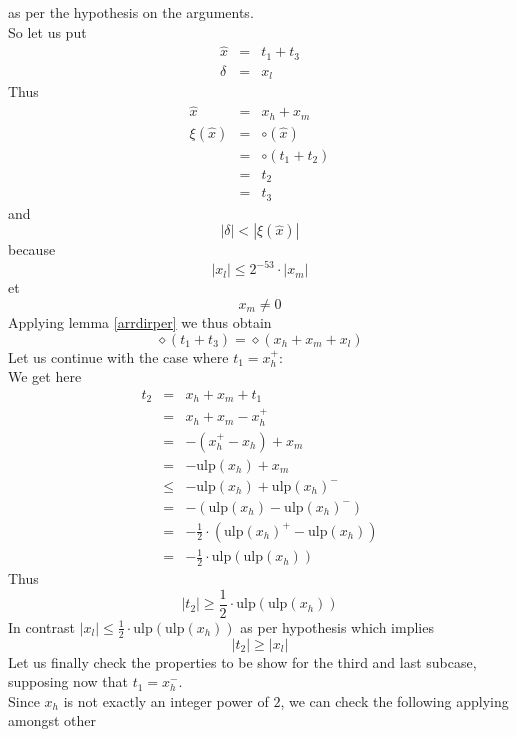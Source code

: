 \documentclass[a4paper,10pt,twoside]{article}
\newenvironment{proof}[1][Proof]{\begin{trivlist}
\item[\hskip \labelsep {\bfseries #1}]}{\end{trivlist}}
\newcommand{\hi}{\ensuremath{\mathit{h}}}
\newcommand{\mi}{\ensuremath{\mathit{m}}}
\newcommand{\lo}{\ensuremath{\mathit{l}}}
\newcommand{\mUlp}{\ensuremath{\mathrm{ulp}}}
\begin{document}
\begin{proof}
as per the hypothesis on the arguments.  \\
So let us put
\begin{eqnarray*}
\hat{x} & = & t_1 + t_3 \\
\delta & = & x_\lo 
\end{eqnarray*}
Thus
\begin{eqnarray*}
\hat{x} & = & x_\hi + x_\mi \\
\xi\left( \hat{x} \right) & = & \circ \left( \hat{x} \right) \\
& = & \circ \left( t_1 + t_2 \right) \\
& = & t_2 \\
& = & t_3
\end{eqnarray*}
and
$$\left \vert \delta \right \vert < \left \vert \xi\left( \hat{x} \right) \right \vert$$
because
$$\left \vert x_\lo \right \vert \leq 2^{-53} \cdot \left \vert x_\mi \right \vert$$
et $$x_\mi \not = 0$$
Applying lemma \ref{arrdirper} we thus obtain 
$$\diamond \left( t_1 + t_3 \right) = \diamond \left( x_\hi + x_\mi + x_\lo \right)$$
Let us continue with the case where $t_1 = x_\hi^+$: \\
We get here
\begin{eqnarray*}
t_2 & = & x_\hi + x_\mi + t_1 \\
& = & x_\hi + x_\mi - x_\hi^+ \\
& = & - \left( x_\hi^+ - x_\hi \right) + x_\mi \\
& = & - \mUlp\left( x_\hi \right) + x_\mi \\
& \leq & -\mUlp\left( x_\hi \right) + \mUlp\left( x_\hi \right)^- \\
& = & - \left( \mUlp\left( x_\hi \right) - \mUlp\left( x_\hi \right)^- \right) \\
& = & - \frac{1}{2} \cdot \left( \mUlp\left( x_\hi \right)^+ - \mUlp\left( x_\hi \right) \right) \\
& = & - \frac{1}{2} \cdot \mUlp\left( \mUlp \left( x_\hi \right) \right)
\end{eqnarray*}
Thus
$$\left \vert t_2 \right \vert \geq \frac{1}{2} \cdot \mUlp\left( \mUlp \left( x_\hi \right) \right)$$
In contrast $\left \vert x_\lo \right \vert \leq \frac{1}{2} \cdot \mUlp\left( \mUlp \left( x_\hi \right) \right)$
as per hypothesis which implies 
$$\left \vert t_2 \right \vert \geq \left \vert x_\lo \right \vert$$
Let us finally check the properties to be show for the third and last subcase, supposing now that
$t_1 = x_\hi^-$. \\
Since $x_\hi$ is not exactly an integer power of $2$, we can check the following applying amongst other 

\end{proof}
\end{document}
